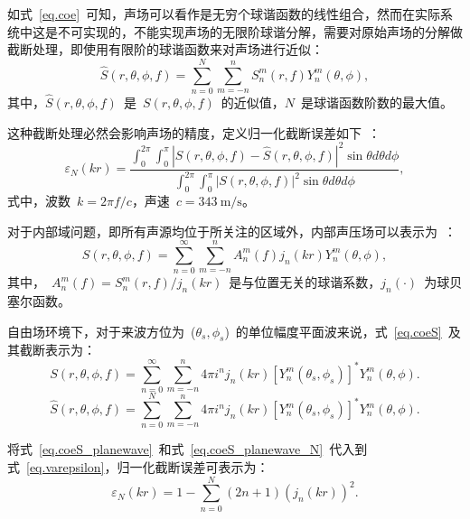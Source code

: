 如式~\eqref{eq.coe}~可知，声场可以看作是无穷个球谐函数的线性组合，然而在实际系统中这是不可实现的，不能实现声场的无限阶球谐分解，需要对原始声场的分解做截断处理，即使用有限阶的球谐函数来对声场进行近似：
\begin{equation}\label{eq.coe_N}
   \hat{S}(r,\theta,\phi,f)=\sum _{n=0}^{N} \sum _{m=-n}^n S_n ^m(r,f)Y_n ^m(\theta,\phi),
\end{equation}
其中，$\hat{S}(r,\theta,\phi,f)$~是~$S(r,\theta,\phi,f)$~的近似值，$N$~是球谐函数阶数的最大值。



这种截断处理必然会影响声场的精度，定义归一化截断误差如下~：
\begin{equation}\label{eq.varepsilon}
  \varepsilon _N(kr)= \frac{\int_{0}^{2\pi}\int _{0}^{\pi} |S(r,\theta,\phi,f)-\hat{S}(r,\theta,\phi,f)|^2 \sin \theta d\theta d\phi }
  {\int_{0}^{2\pi}\int _{0}^{\pi} |S(r,\theta,\phi,f)|^2 \sin \theta d\theta d\phi } ,
\end{equation}
式中，波数~$k=2\pi f/c$，声速~$c=343~\mathrm{m}/\mathrm{s}$。

对于内部域问题，即所有声源均位于所关注的区域外，内部声压场可以表示为~：
\begin{equation}\label{eq.coeS}
   S(r,\theta,\phi,f)=\sum _{n=0}^\infty \sum _{m=-n}^n A_n ^m(f)j_n(kr)Y_n ^m(\theta,\phi),
\end{equation}
其中，~$A_n ^m(f)=S_n ^m(r,f)/{j_n(kr)}$~是与位置无关的球谐系数，$j_n(\cdot)$~为球贝塞尔函数。

自由场环境下，对于来波方位为~($\theta_{s},\phi_{s}$)~的单位幅度平面波来说，式~\eqref{eq.coeS}~及其截断表示为：
\begin{equation}\label{eq.coeS_planewave}
   S(r,\theta,\phi,f)=\sum _{n=0}^\infty \sum _{m=-n}^n 4\pi i^{n} j_n(kr)\left[ Y_n ^m(\theta_{s},\phi_{s}) \right] ^{*} Y_n ^m(\theta,\phi).
\end{equation}
\begin{equation}\label{eq.coeS_planewave_N}
   \hat{S}(r,\theta,\phi,f)=\sum _{n=0}^{N} \sum _{m=-n}^n 4\pi i^{n} j_n(kr)\left[ Y_n ^m(\theta_{s},\phi_{s}) \right] ^{*} Y_n ^m(\theta,\phi).
\end{equation}

将式~\eqref{eq.coeS_planewave}~和式~\eqref{eq.coeS_planewave_N}~代入到式~\eqref{eq.varepsilon}，归一化截断误差可表示为：
\begin{equation}\label{varepsilon1}
  \varepsilon _N(kr)=1-\sum _{n=0}^ N(2n+1)(j_n(kr))^2.
\end{equation}

